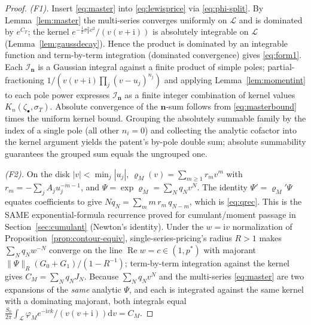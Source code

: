 \documentclass[11pt]{article}
\DeclareMathOperator{\Real}{Re}
\newcommand{\Ii}{\mathrm{i}}
\newcommand{\dd}{\mathrm{d}}
\theoremstyle{plain}
\theoremstyle{definition}
\theoremstyle{remark}
\begin{document}
\begin{proof}
\emph{(F1).} Insert \eqref{eq:master} into \eqref{eq:lewisprice} via
\eqref{eq:phi-split}. By Lemma~\ref{lem:master} the multi-series converges
uniformly on $\mathcal L$ and is dominated by $e^{C_T}$; the kernel
$e^{-\frac12\sigma_T^2v^2}/(v(v+\Ii))$ is absolutely integrable on $\mathcal L$
(Lemma~\ref{lem:gaussdecay}). Hence the product is dominated by an integrable
function and term-by-term integration (dominated convergence) gives
\eqref{eq:form1}. Each $\mathcal I_{\mathbf n}$ is a Gaussian integral against a
finite product of simple poles; partial-fractioning $1/(v(v+\Ii)\prod_j(v-u_j)^{n_j})$
and applying Lemma~\ref{lem:momentint} to each pole power expresses
$\mathcal I_{\mathbf n}$ as a finite integer combination of kernel values
$K_n(\zeta_\bullet,\sigma_T)$. Absolute convergence of the $\mathbf n$-sum follows
from \eqref{eq:masterbound} times the uniform kernel bound. Grouping the
absolutely summable family by the index of a single pole (all other $n_i=0$) and
collecting the analytic cofactor into the kernel argument yields the patent's
by-pole double sum; absolute summability guarantees the grouped sum equals the
ungrouped one.

\emph{(F2).} On the disk $|v|<\min_j|u_j|$, $\varrho_M(v)=\sum_{m\ge1}r_mv^m$ with
$r_m=-\sum_j A_j u_j^{-m-1}$, and $\Psi=\exp\varrho_M=\sum_N q_Nv^N$. The identity
$\Psi'=\varrho_M'\Psi$ equates coefficients to give
$Nq_N=\sum_{m}m\,r_m\,q_{N-m}$, which is \eqref{eq:qrec}. This is the SAME
exponential-formula recurrence proved for cumulant/moment passage in
Section~\ref{sec:cumulant} (Newton's identity). Under the $w=\Ii v$ normalization
of Proposition~\ref{prop:contour-equiv}, single-series-pricing's radius $R>1$
makes $\sum_N q_N w^{-N}$ converge on the line $\Real w=c\in(1,p^\ast)$ with
majorant $\|\Psi\|_R(G_0+G_1)/(1-R^{-1})$; term-by-term integration against the
kernel gives $C_M=\sum_N q_NJ_N$. Because $\sum_Nq_Nv^N$ and the multi-series
\eqref{eq:master} are two expansions of the \emph{same} analytic $\Psi$, and each
is integrated against the same kernel with a dominating majorant, both integrals
equal $\frac{S_0}{2\pi}\int_{\mathcal L}\varphi_M e^{-\Ii vk}/(v(v+\Ii))\dd v=C_M$.


\end{proof}
\end{document}
